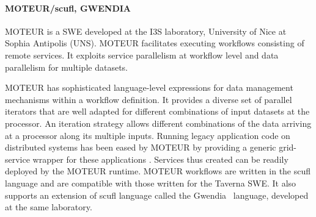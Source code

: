 \paragraph{MOTEUR/scufl, GWENDIA} MOTEUR \cite{glatard-montagnat-etal:2008} is a SWE
developed at the I3S laboratory, University of Nice at Sophia Antipolis (UNS).
MOTEUR facilitates executing workflows consisting of remote services. It
exploits service parallelism at workflow level and data parallelism for
multiple datasets. 

MOTEUR has sophisticated language-level expressions for data management
mechanisms within a workflow definition. It provides a diverse set of
parallel iterators that are well adapted for different combinations of input datasets
at the processor. An iteration strategy allows different combinations of the
data arriving at a processor along its multiple inputs. Running legacy
application code on distributed systems has been eased by MOTEUR by providing a
generic grid-service wrapper for these applications
\cite{glatard-montagnat-etal:2008a}. Services thus created can be readily
deployed by the MOTEUR runtime. MOTEUR workflows are written in the scufl
language and are compatible with those written for the Taverna SWE. It also
supports an extension of scufl language called the Gwendia~\cite{gwendia}
language, developed at the same laboratory. 
%
